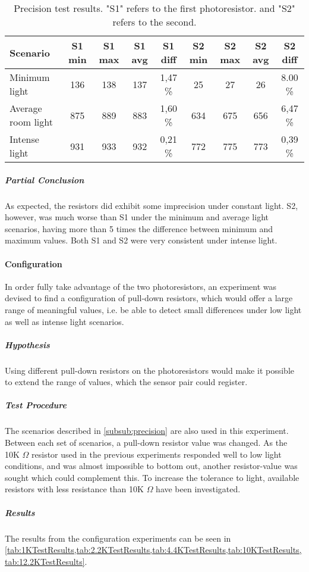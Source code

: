   \begin{table}
    \centering
    \begin{tabular}[H!]{m{4.5em} c c c c c c c c}
      Scenario & S1 min & S1 max & S1 avg & S1 diff & S2 min & S2 max & S2 avg & S2 diff \\
      \hline
      Minimum light & 136 & 138 & 137 & 1,47 \% & 25 & 27 & 26 & 8.00 \% \\
      Average room light & 875 & 889 & 883 & 1,60 \%  & 634 & 675 & 656 & 6,47 \% \\
      Intense light & 931 & 933 & 932 & 0,21 \%  & 772 & 775 & 773 & 0,39 \% \\
    \end{tabular}
    \caption{Precision test results. "S1" refers to the first photoresistor. and "S2" refers to the second.}\label{tab:precisionTestResults}
  \end{table}
\subparagraph{Partial Conclusion}
As expected, the resistors did exhibit some imprecision under constant light. S2, however, was much worse than S1 under the minimum and average light scenarios, having more than 5 times the difference between minimum and maximum values. Both S1 and S2 were very consistent under intense light. 

\paragraph{Configuration}
In order fully take advantage of the two photoresistors, an experiment was devised to find a configuration of pull-down resistors, which would offer a large range of meaningful values, i.e. be able to detect small differences under low light as well as intense light scenarios.
\subparagraph{Hypothesis}
Using different pull-down resistors on the photoresistors would make it possible to extend the range of values, which the sensor pair could register.
\subparagraph{Test Procedure}
The scenarios described in \cref{subsub:precision} are also used in this experiment. Between each set of scenarios, a pull-down resistor value was changed. As the 10K $\Omega$ resistor used in the previous experiments responded well to low light conditions, and was almost impossible to bottom out, another resistor-value was sought which could complement this. To increase the tolerance to light, available resistors with less resistance than 10K $\Omega$ have been investigated.
\subparagraph{Results}
The results from the configuration experiments can be seen in \cref{tab:1KTestResults,tab:2.2KTestResults,tab:4.4KTestResults,tab:10KTestResults,tab:12.2KTestResults}.


